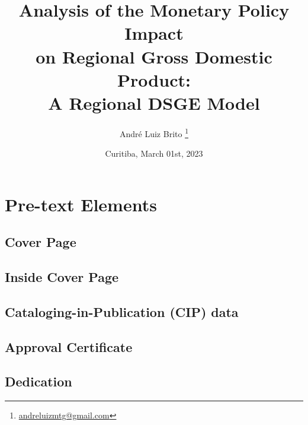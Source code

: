 \documentclass[
	12pt,
	]{article}
\title{
	Analysis of the Monetary Policy Impact \\ 
	on Regional Gross Domestic Product: \\ 
	A Regional DSGE Model \vspace{2cm}}
\author{
	\LARGE André Luiz Brito 
	\footnote{ \href{ 
	mailto:andreluizmtg@gmail.com}{
	andreluizmtg@gmail.com}}}
\date{
	\vfill Curitiba, March 01st, 2023}
\numberwithin{equation}{section}
\theoremstyle{definition}
\theoremstyle{plain}
\theoremstyle{plain}
\theoremstyle{plain}
\begin{document}

\maketitle

\thispagestyle{empty}

\newpage


\section*{Pre-text Elements}

\subsection*{Cover Page}

\thispagestyle{empty}


\subsection*{Inside Cover Page}

\thispagestyle{empty}


\subsection*{Cataloging-in-Publication (CIP) data}

\thispagestyle{empty}


\subsection*{Approval Certificate}

\thispagestyle{empty}


\subsection*{Dedication}
\end{document}
